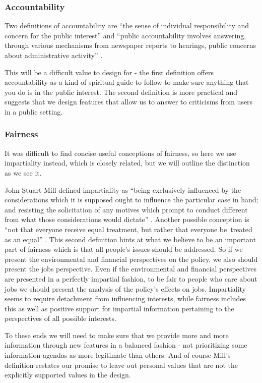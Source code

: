 \documentclass{sigchi}
\begin{document}
\subsubsection{Accountability}
Two definitions of accountability are ``the sense of individual responsibility and concern for the 
public interest'' \cite{mulgan} and ``public  accountability  involves  answering,  through  various 
mechanisms  from  newspaper  reports  to  hearings,  public  concerns  about  administrative 
activity'' \cite{sinclair}. 

This will be a difficult value to design for - the first definition offers accountability as a kind of 
spiritual guide to follow to make sure anything that you do is in the public interest. The second 
definition is more practical and suggests that we design features that allow us to answer to criticisms 
from users in a public setting. 

\subsubsection{Fairness}
It was difficult to find concise useful conceptions of fairness, so here we use
impartiality instead, which is closely related, but we will outline the distinction as we see it. 

John Stuart Mill defined impartiality as ``being exclusively influenced by the considerations 
which it is supposed ought to influence the particular case in hand; and resisting the 
solicitation of any motives which prompt to conduct different from what those considerations 
would dictate'' \cite{mill}. Another possible conception is ``not that everyone receive equal 
treatment, but rather that everyone be treated as an equal'' \cite{stanford}. This second definition 
hints at what we believe to be an important part of fairness which is that all people's issues 
should be addressed. So if we present the environmental and financial perspectives on the policy, 
we also should present the jobs perspective. Even if the environmental and financial perspectives 
are presented in a perfectly impartial fashion, to be fair to people who care about jobs we should 
present the analysis of the policy's effects on jobs. Impartiality seems to require detachment from 
influencing interests, while fairness includes this as well as positive support for impartial 
information pertaining to the perspectives of all possible interests. 

To these ends we will need to make sure that we provide more and more information through 
new features in a balanced fashion - not prioritizing some information agendas 
as more legitimate than others. And of course Mill's definition restates our promise to leave 
out personal values that are not the explicitly supported values in the design. 
\end{document}
